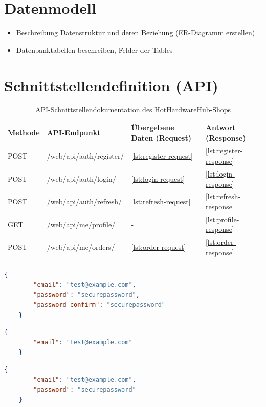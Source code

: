 \documentclass[%
	12pt,
	a4paper,
	oneside,
	parskip=full
]{scrbook}
\begin{document}
\chapter{Datenmodell}
\begin{itemize}
	\item Beschreibung Datenstruktur und deren Beziehung (ER-Diagramm erstellen)
	\item Datenbanktabellen beschreiben, Felder der Tables
\end{itemize}

\chapter{Schnittstellendefinition (API)}

\begin{longtable}{|l|l|l|l|}
	\hline
	\textbf{Methode} & \textbf{API-Endpunkt} & \textbf{Übergebene Daten (Request)} & \textbf{Antwort (Response)} \\
	\hline
	POST & /web/api/auth/register/ & \ref{lst:register-request} & \ref{lst:register-response} \\
	\hline
	POST & /web/api/auth/login/ & \ref{lst:login-request} & \ref{lst:login-response} \\
	\hline
	POST & /web/api/auth/refresh/ & \ref{lst:refresh-request} & \ref{lst:refresh-response} \\
	\hline
	GET & /web/api/me/profile/ & - & \ref{lst:profile-response} \\
	\hline
	POST & /web/api/me/orders/ & \ref{lst:order-request} & \ref{lst:order-response} \\
	\hline
	\caption{API-Schnittstellendokumentation des HotHardwareHub-Shops}
	\label{tab:api_docs}
\end{longtable}

\begin{lstlisting}[language=json, caption={Request für Registrierung}, label=lst:register-request]
	{
		"email": "test@example.com",
		"password": "securepassword",
		"password_confirm": "securepassword"
	}
\end{lstlisting}

\begin{lstlisting}[language=json, caption={Response für Registrierung}, label=lst:register-response]
	{
		"email": "test@example.com"
	}
\end{lstlisting}

\begin{lstlisting}[language=json, caption={Request für Login}, label=lst:login-request]
	{
		"email": "test@example.com",
		"password": "securepassword"
	}
\end{lstlisting}
\end{document}
